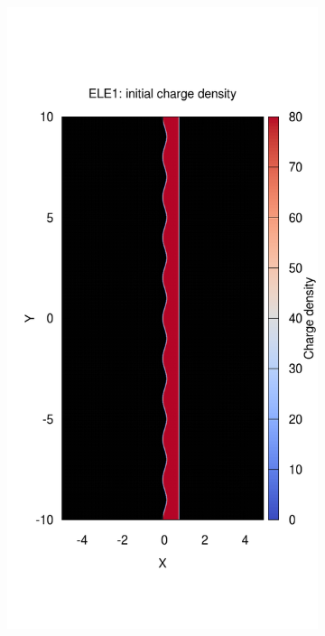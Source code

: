 \documentclass[11pt,a4paper]{report}
\begin{document}
\begin{figure}[htbp]
        \centering
          \begin{subfigure}[c]{0.3\textwidth}
                \includegraphics[width=\textwidth]{2d.png}                
                

\end{subfigure}
\end{figure}
\end{document}
